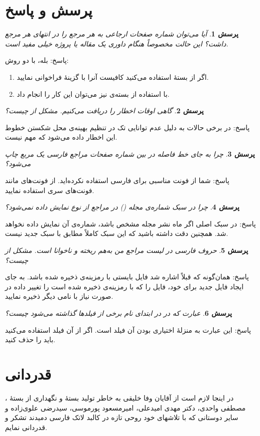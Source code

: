 \documentclass{article}
\theoremstyle{plain}\newtheorem{question}{پرسش}
\newcommand{\answer}{{\noindent \Sayeh پاسخ: }}
\newcommand\SLASH{\char`\\}
\begin{document}
\section{پرسش و پاسخ} 
\begin{question} آیا می‌توان شماره صفحات ارجاعی به هر مرجع را در انتهای هر مرجع داشت؟ این حالت مخصوصاً هنگام‌ داوری یک مقاله یا پروژه 
خیلی مفید است.
\end{question}
\answer
بله، با دو روش:
\begin{enumerate}
\item
اگر از بستهٔ  استفاده می‌کنید کافیست آنرا با گزینهٔ  فراخوانی نمایید.
\item
با استفاده از بسته‌ی  نیز می‌توان این کار را انجام داد.
\end{enumerate}

\begin{question} گاهی اوقات اخطار \lr{Underfull \SLASH hbox} را دریافت می‌کنیم. مشکل از چیست؟ \end{question}
\answer در برخی حالات به دلیل عدم توانایی تک در تنظیم بهینه‌ی محل شکستن خطوط این اخطار داده می‌شود که مهم نیست.

\begin{question} چرا به جای خط فاصله در بین شماره صفحات مراجع فارسی یک مربع چاپ می‌شود؟ \end{question}
\answer شما از فونت‌ مناسبی برای فارسی استفاده نکرده‌اید. از فونت‌های مانند فونت‌های سری  استفاده نمایید. 

\begin{question} چرا در سبک   شماره‌ی مجله () در مراجع از نوع  نمایش داده نمی‌شود؟ \end{question}
\answer در سبک اصلی  اگر ماه نشر مجله مشخص باشد، شماره‌ی آن نمایش داده نخواهد شد.
 همچنین دقت داشته باشید که این سبک کاملاً مطابق با سبک جدید  نیست.

\begin{question} حروف فارسی در لیست مراجع من به‌هم ریخته و ناخوانا است. مشکل از چیست؟ \end{question}
\answer همان‌گونه که قبلاً اشاره شد فایل  بایستی با رمزینه‌ی  ذخیره شده باشد. به جای ایجاد فایل  جدید برای خود، 
فایل  را که با رمزینه‌ی  ذخیره شده است را تغییر داده در صورت نیاز با نامی دیگر ذخیره نمایید. 

\begin{question} عبارت  که در  در ابتدای نام برخی از فیلدها گذاشته می‌شود چیست؟ \end{question}
\answer این عبارت به منزله‌ٔ اختیاری بودن آن فیلد است. اگر از آن فیلد استفاده می‌کنید باید  را حذف کنید.

\section*{قدردانی}
در اینجا لازم است از آقایان وفا خلیقی به خاطر تولید بستهٔ \XePersian و نگهداری از بستهٔ ، مصطفی واحدی، دکتر مهدی امیدعلی، امیرمسعود پورموسی، سیدرضی علوی‌زاده و سایر دوستانی که با تلاشهای خود روحی تازه در کالبد لاتک فارسی دمیدند تشکر و قدردانی نمایم.


\end{document}

